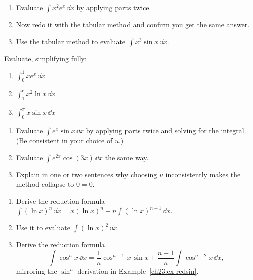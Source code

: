 \begin{exercise}
\label{ch23:exr-tworounds}
\begin{enumerate}[label=(\alph*)]
\item Evaluate $\displaystyle\int x^2 e^{x}\,\dd x$ by applying parts twice.
\item Now redo it with the tabular method and confirm you get the same answer.
\item Use the tabular method to evaluate $\displaystyle\int x^3\sin x\,\dd x$.
\end{enumerate}
\end{exercise}

\begin{exercise}
\label{ch23:exr-definite}
Evaluate, simplifying fully:
\begin{enumerate}[label=(\alph*)]
\item $\displaystyle\int_0^1 x e^{x}\,\dd x$
\item $\displaystyle\int_1^{e} x^2\ln x\,\dd x$
\item $\displaystyle\int_0^{\pi} x\sin x\,\dd x$
\end{enumerate}
\end{exercise}

\begin{exercise}
\label{ch23:exr-recurring}
\begin{enumerate}[label=(\alph*)]
\item Evaluate $\displaystyle\int e^{x}\sin x\,\dd x$ by applying parts twice and
solving for the integral. (Be consistent in your choice of $u$.)
\item Evaluate $\displaystyle\int e^{2x}\cos(3x)\,\dd x$ the same way.
\item Explain in one or two sentences why choosing $u$ inconsistently makes the
method collapse to $0=0$.
\end{enumerate}
\end{exercise}

\begin{exercise}
\label{ch23:exr-reduction}
\begin{enumerate}[label=(\alph*)]
\item Derive the reduction formula
$\displaystyle\int (\ln x)^n\,\dd x = x(\ln x)^n - n\int(\ln x)^{n-1}\,\dd x$.
\item Use it to evaluate $\displaystyle\int (\ln x)^2\,\dd x$.
\item Derive the reduction formula
\[
\int\cos^n x\,\dd x = \frac{1}{n}\cos^{n-1}x\,\sin x
+ \frac{n-1}{n}\int\cos^{n-2}x\,\dd x,
\]
mirroring the $\sin^n$ derivation in Example~\ref{ch23:ex-redsin}.
\end{enumerate}
\end{exercise}

